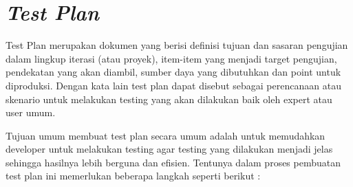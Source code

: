 \section {\textit{Test Plan}}
\par Test Plan merupakan dokumen yang berisi definisi tujuan dan sasaran pengujian dalam lingkup iterasi (atau proyek), item-item yang menjadi target pengujian, pendekatan yang akan diambil, sumber daya yang dibutuhkan dan point untuk diproduksi. Dengan kata lain test plan dapat disebut sebagai perencanaan atau skenario untuk melakukan testing yang akan dilakukan baik oleh expert atau user umum. 
\par Tujuan umum membuat test plan secara umum adalah untuk memudahkan developer untuk melakukan testing agar testing yang dilakukan menjadi jelas sehingga hasilnya lebih berguna dan efisien. Tentunya dalam proses pembuatan test plan ini memerlukan beberapa langkah seperti berikut : \citep{software2008ieee}
